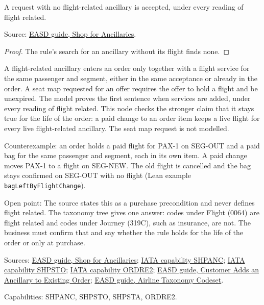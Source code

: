 \begin{theorem}
  \label{thm:ancillaries-add-accepts-unrelated}
  A request with no flight-related ancillary is accepted, under every
  reading of flight related.

  Source: \href{https://standards.atlassian.net/wiki/spaces/EASD/pages/574226524}{EASD guide, Shop for Ancillaries}.
\end{theorem}
\begin{proof}
  The rule's search for an ancillary without its flight finds none.
\end{proof}

\begin{theorem}
  \label{thm:ancillaries-ancillary-needs-flight}
  A flight-related ancillary enters an order only together with a flight
  service for the same passenger and segment, either in the same acceptance
  or already in the order. A seat map requested for an offer requires the
  offer to hold a flight and be unexpired.
  The model proves the first sentence when services are added, under every
  reading of flight related.  This node checks the stronger claim that it
  stays true for the life of the order: a paid change to an order item keeps
  a live flight for every live flight-related ancillary.  The seat map
  request is not modelled.

  Counterexample: an order holds a paid flight for PAX-1 on SEG-OUT and a
  paid bag for the same passenger and segment, each in its own item.  A
  paid change moves PAX-1 to a flight on SEG-NEW.  The old flight is
  cancelled and the bag stays confirmed on SEG-OUT with no flight (Lean
  example \texttt{bagLeftByFlightChange}).

  Open point: The source states this as a purchase precondition and never
  defines flight related. The taxonomy tree gives one answer: codes under
  Flight (0064) are flight related and codes under Journey (319C), such as
  insurance, are not. The business must confirm that and say whether the
  rule holds for the life of the order or only at purchase.

  Sources: \href{https://standards.atlassian.net/wiki/spaces/EASD/pages/574226524}{EASD guide, Shop for Ancillaries};
  \href{https://retailing.iata.org/armi/docs/SHPANC/}{IATA capability SHPANC};
  \href{https://retailing.iata.org/armi/docs/SHPSTO/}{IATA capability SHPSTO};
  \href{https://retailing.iata.org/armi/docs/ORDRE2/}{IATA capability ORDRE2};
  \href{https://standards.atlassian.net/wiki/spaces/EASD/pages/842301482}{EASD guide, Customer Adds an Ancillary to Existing Order};
  \href{https://standards.atlassian.net/wiki/spaces/EASD/pages/574652513}{EASD guide, Airline Taxonomy Codeset}.

  Capabilities: SHPANC, SHPSTO, SHPSTA, ORDRE2.
\end{theorem}
